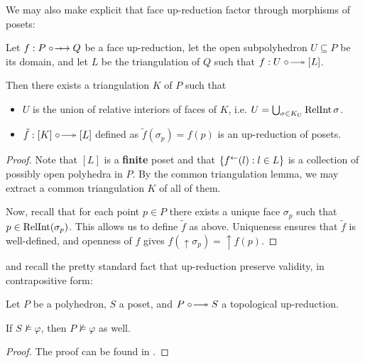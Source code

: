 We may also make explicit that face up-reduction factor through morphisms of posets:

\begin{lemma}\label{triangupred}
    Let $f:P\fupred Q$ be a face up-reduction, let the open subpolyhedron $U\subseteq P$ be its domain, and let $L$ be the triangulation of $Q$ such that $f:U\upred [L]$.

    Then there exists a triangulation $K$ of $P$ such that
    \begin{itemize}
        \item $U$ is the union of relative interiors of faces of $K$, i.e. $U=\bigcup_{\sigma\in K_U}\operatorname{RelInt}\sigma$.
        \item $\tilde{f}:[K]\upred[L]$ defined as $\tilde{f}(\sigma_p)=f(p)$ is an up-reduction of posets.
    \end{itemize}
\end{lemma}
\begin{proof}
    Note that $[L]$ is a \textbf{finite} poset and that $\left\{ f^\gets(l):l\in L \right\}$ is a collection of possibly open polyhedra in $P$. By the common triangulation lemma, we may extract a common triangulation $K$ of all of them.

    Now, recall that for each point $p\in P$ there exists a unique face $\sigma_p$ such that $p\in\operatorname{RelInt}(\sigma_p)$. This allows us to define $\tilde{f}$ as above. Uniqueness ensures that $\tilde{f}$ is well-defined, and openness of $f$ gives $f(\uparrow\sigma_p)=\uparrow f(p)$.
\end{proof}

and recall the pretty standard fact that up-reduction preserve validity, in contrapositive form:
\begin{lemma}
    Let $P$ be a polyhedron, $S$ a poset, and $P\upred S$ a topological up-reduction.

    If $S\not\models \varphi$, then $P\not\models\varphi$ as well.
\end{lemma}
\begin{proof}
    The proof can be found in \cite{Gabelaia2001ModalDI}.
\end{proof}


